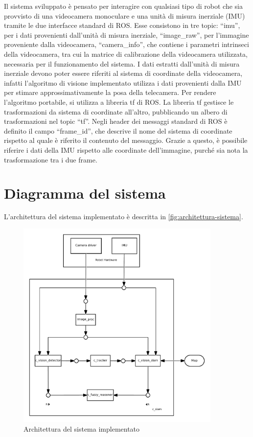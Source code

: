 Il sistema sviluppato è pensato per interagire con qualsiasi tipo di robot che sia provvisto di una videocamera monoculare e una unità di misura inerziale (IMU) tramite le due interfacce standard di ROS.
Esse consistono in tre topic: ``imu'', per i dati provenienti dall'unità di misura inerziale, ``image\_raw'', per l'immagine proveniente dalla videocamera, ``camera\_info'', che contiene i parametri intrinseci della videocamera, tra cui la matrice di calibrazione della videocamera utilizzata, necessaria per il funzionamento del sistema.
I dati estratti dall'unità di misura inerziale devono poter essere riferiti al sistema di coordinate della videocamera, infatti l'algoritmo di visione implementato utilizza i dati provenienti dalla IMU per stimare approssimativamente la posa della telecamera.
Per rendere l'algoritmo portabile, si utilizza a libreria tf di ROS. La libreria tf gestisce le trasformazioni da sistema di coordinate all'altro, pubblicando un albero di trasformazioni nel topic ``tf''.
Negli header dei messaggi standard di ROS è definito il campo ``frame\_id'', che descrive il nome del sistema di coordinate rispetto al quale è riferito il contenuto del messaggio. Grazie a questo, è possibile riferire i dati della IMU rispetto alle coordinate dell'immagine, purché sia nota la trasformazione tra i due frame.

\section{Diagramma del sistema}

L'architettura del sistema implementato è descritta in \autoref{fig:architettura-sistema}. \\
\begin{figure}[ht]
  \includegraphics[width=0.9\textwidth]{diagrammi/Sistema}
  \caption{Architettura del sistema implementato}
  \label{fig:architettura-sistema}
\end{figure}


